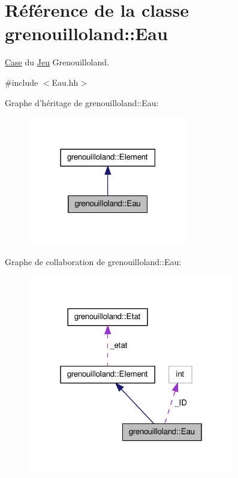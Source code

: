 \hypertarget{classgrenouilloland_1_1Eau}{\section{Référence de la classe grenouilloland\-:\-:Eau}
\label{classgrenouilloland_1_1Eau}
}


\hyperlink{classgrenouilloland_1_1Case}{Case} du \hyperlink{classgrenouilloland_1_1Jeu}{Jeu} Grenouilloland.  




{\ttfamily \#include $<$Eau.\-hh$>$}



Graphe d'héritage de grenouilloland\-:\-:Eau\-:
\nopagebreak
\begin{figure}[H]
\begin{center}
\leavevmode
\includegraphics[width=198pt]{classgrenouilloland_1_1Eau__inherit__graph}
\end{center}
\end{figure}


Graphe de collaboration de grenouilloland\-:\-:Eau\-:
\nopagebreak
\begin{figure}[H]
\begin{center}
\leavevmode
\includegraphics[width=256pt]{classgrenouilloland_1_1Eau__coll__graph}
\end{center}
\end{figure}
